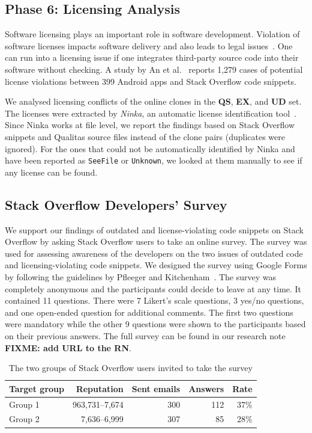 \documentclass[10pt,journal,compsoc]{IEEEtran}
\newcommand\FIXME[1]{{\color{red}\textbf{FIXME: #1}}}
\begin{document}
\subsection{Phase 6: Licensing Analysis} Software licensing plays an important
role in software development. Violation of software licenses impacts software
delivery and also leads to legal issues~\cite{Sprigman2015}. 
One can run into a licensing issue if one integrates third-party source code
into their software without checking. A study by An et al.~\cite{An2017} reports
1,279 cases of potential license violations between 399 Android apps and Stack
Overflow code snippets.

We analysed licensing conflicts of the online clones in the \textbf{QS},
\textbf{EX}, and \textbf{UD} set. The licenses were extracted by \emph{Ninka},
an automatic license identification tool~\cite{German2010}. Since Ninka works at
file level, we report the findings based on Stack Overflow snippets and Qualitas
source files instead of the clone pairs (duplicates were ignored). For the ones
that could not be automatically identified by Ninka and have been reported as
{\small\texttt{SeeFile}} or {\small\texttt{Unknown}}, we looked at them manually
to see if any license can be found.

\subsection{Stack Overflow Developers' Survey} We support our findings of
outdated and license-violating code snippets on Stack Overflow by asking Stack
Overflow users to take an online survey. The survey was used for assessing awareness of
the developers on the two issues of outdated code and licensing-violating code
snippets. We designed the survey using Google Forms by following the guidelines by Pfleeger and
Kitchenham~\cite{Pfleeger2001,Kitchenham2002}. The survey was completely
anonymous and the participants could decide to leave at any time. It contained
11 questions. There were 7 Likert's scale questions, 3 yes/no questions, and one
open-ended question for additional comments. The first two questions were
mandatory while the other 9 questions were shown to the participants based on
their previous answers. The full survey can be found in our research note~
\FIXME{add URL to the RN}.


\begin{table}
	\centering
	\caption{The two groups of Stack Overflow users invited to take the survey}
	\label{tab:survey_target}
	\begin{tabular}{lrrrr}
		\toprule
		Target group & Reputation & Sent emails & Answers & Rate \\
		\midrule
		Group 1 & 963,731--7,674 & 300 & 112 & 37\% \\
		Group 2 & 7,636--6,999 & 307 & 85 & 28\% \\
		\bottomrule
	\end{tabular}
\end{table}
\end{document}
